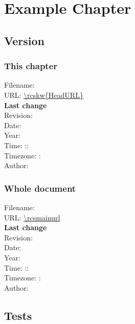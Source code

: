 
\chapter{Example Chapter}

\section{Version}
\subsection*{This chapter}
Filename: \\
URL: \url{\rcskw{HeadURL}}\\
\textbf{Last change}\\
Revision: \rcsfilerev\\
Date: \rcsfiledate\\
Year: \rcsfileyear\\
Time: \rcsfilehour:\rcsfileminute:\rcsfilesecond\ \\
Timezone: \rcsfiletimezonehour : \rcsfiletimezoneminute\\
Author: \rcsfileauthor\\

\subsection*{Whole document}
Filename: \rcsnolinkurl{\rcsmainfilename}\\
URL: \url{\rcsmainurl}\\
\textbf{Last change}\\
Revision: \rcsrev\\
Date: \rcsdate\\
Year: \rcsyear\\
Time: \rcshour:\rcsminute:\rcssecond\ \\
Timezone: \rcstimezonehour : \rcstimezoneminute\\
Author: \rcsauthor\\

\section{Tests}

